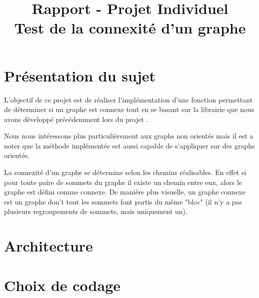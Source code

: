 
\title{Rapport - Projet Individuel \\\Large Test de la connexité d'un graphe}
\fancyhf{}
\lhead{\leftmark}


	\maketitle
	\tableofcontents
	\chapter{Présentation du sujet}
		L'objectif de ce projet est de réaliser l'implémentation d'une fonction permettant de déterminer si un graphe est connexe tout en se basant sur la librairie que nous avons développé précédemment lors du projet .		
		
		Nous nous intéressons plus particulièrement aux graphs non orientés mais il est a noter que la méthode implémentée est aussi capable de s'appliquer sur des graphs orientés.
		
		La connexité d'un graphe se détermine selon les chemins réalisables. En effet si pour toute paire de sommets du graphe il existe un chemin entre eux, alors le graphe est défini comme connexe. De manière plus visuelle, un graphe connexe est un graphe don't tout les sommets font partis du même "bloc" (il n'y a pas plusieurs regroupements de sommets, mais uniquement un).
	
	\chapter{Architecture}
		
		
		
		\newpage
		
	\chapter{Choix de codage}
		
		
		
